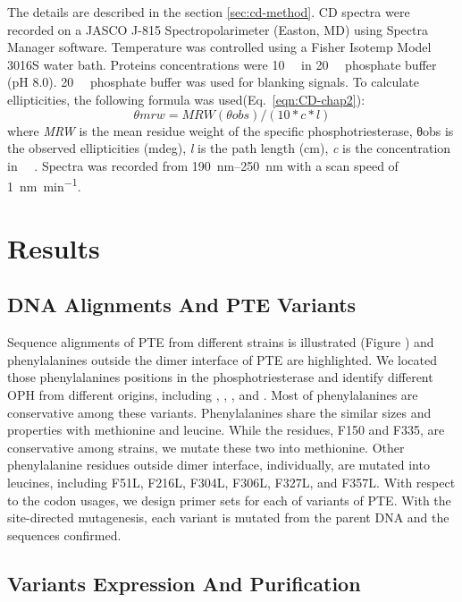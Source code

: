 \begin{refsection}
The details are described in the section \ref{sec:cd-method}. CD spectra were
recorded on a JASCO J-815 Spectropolarimeter (Easton, MD) using Spectra Manager
software. Temperature was controlled using a Fisher Isotemp Model 3016S water
bath. Proteins concentrations were \SI{10}{\micro\Molar} in
\SI{20}{\milli\Molar} phosphate buffer (pH 8.0). \SI{20}{\milli\Molar}
phosphate buffer was used for blanking signals. To calculate ellipticities, the
following formula was used(Eq.~\ref{eqn:CD-chap2}): 
\begin{equation}
    θmrw = MRW(θobs) / (10 * c * l)
    \label{eqn:CD-chap2}
\end{equation}
where \emph{MRW} is the mean residue weight of the specific phosphotriesterase,
θobs is the observed ellipticities (mdeg), \emph{l} is the path length (cm),
\emph{c} is the concentration in \SI{}{\micro\Molar}. Spectra was recorded from
\SIrange{190}{250}{\nm} with a scan speed of \SI{1}{\nano\meter\per\minute}.

\section{Results}

\subsection{DNA Alignments And PTE Variants}

Sequence alignments of PTE from different strains is illustrated (Figure ) and
phenylalanines outside the dimer interface of PTE are highlighted. We located
those phenylalanines positions in the phosphotriesterase and identify different
OPH from different origins, including  ,
, , and . Most
of phenylalanines are conservative among these variants. Phenylalanines share
the similar sizes and properties with methionine and leucine. While the
residues, F150 and F335, are conservative among strains, we mutate these two
into methionine. Other phenylalanine residues outside dimer interface,
individually, are mutated into leucines, including F51L, F216L, F304L, F306L,
F327L, and F357L. With respect to the codon usages, we design primer sets for
each of variants of PTE. With the site-directed mutagenesis,
each variant is mutated from the parent DNA and the sequences  confirmed.

\subsection{Variants Expression And Purification}


\end{refsection}

